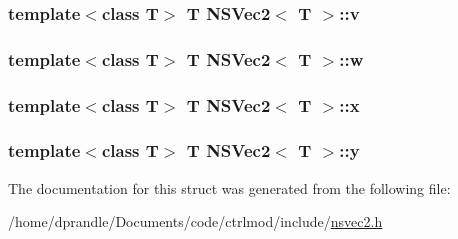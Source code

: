 \hypertarget{structNSVec2_a2d1a92faf45f189d0dc0dce956afbaab}{
\subsubsection[{v}]{\setlength{\rightskip}{0pt plus 5cm}template$<$class T$>$ T {\bf N\-S\-Vec2}$<$ T $>$\-::v}}\label{structNSVec2_a2d1a92faf45f189d0dc0dce956afbaab}
\hypertarget{structNSVec2_a9f38b9ce14ade7d2c54ca8d02f64c13d}{
\subsubsection[{w}]{\setlength{\rightskip}{0pt plus 5cm}template$<$class T$>$ T {\bf N\-S\-Vec2}$<$ T $>$\-::w}}\label{structNSVec2_a9f38b9ce14ade7d2c54ca8d02f64c13d}
\hypertarget{structNSVec2_a06fdf0c2e7c1a8ca6d03259b978d1f6e}{
\subsubsection[{x}]{\setlength{\rightskip}{0pt plus 5cm}template$<$class T$>$ T {\bf N\-S\-Vec2}$<$ T $>$\-::x}}\label{structNSVec2_a06fdf0c2e7c1a8ca6d03259b978d1f6e}
\hypertarget{structNSVec2_a95410f817c58a44b7af88079527cf7e6}{
\subsubsection[{y}]{\setlength{\rightskip}{0pt plus 5cm}template$<$class T$>$ T {\bf N\-S\-Vec2}$<$ T $>$\-::y}}\label{structNSVec2_a95410f817c58a44b7af88079527cf7e6}


The documentation for this struct was generated from the following file\-:\begin{DoxyCompactItemize}
\item 
/home/dprandle/\-Documents/code/ctrlmod/include/\hyperlink{nsvec2_8h}{nsvec2.\-h}\end{DoxyCompactItemize}
